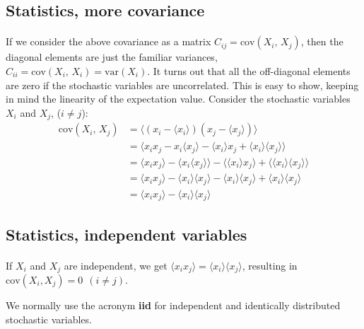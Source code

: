 \documentclass[%
oneside,                 %
final,                   %
10pt]{article}
\begin{document}
\subsection{Statistics, more covariance}

\paragraph{}
If we consider the above covariance as a matrix $C_{ij}=\mathrm{cov}(X_i,\,X_j)$, then the diagonal elements are just the familiar
variances, $C_{ii} = \mathrm{cov}(X_i,\,X_i) = \mathrm{var}(X_i)$. It turns out that
all the off-diagonal elements are zero if the stochastic variables are
uncorrelated. This is easy to show, keeping in mind the linearity of
the expectation value. Consider the stochastic variables $X_i$ and
$X_j$, ($i\neq j$):
\begin{align}
\mathrm{cov}(X_i,\,X_j) &= \langle(x_i-\langle x_i\rangle)(x_j-\langle x_j\rangle)\rangle\\
&=\langle x_i x_j - x_i\langle x_j\rangle - \langle x_i\rangle x_j + \langle x_i\rangle\langle x_j\rangle\rangle \\
&=\langle x_i x_j\rangle - \langle x_i\langle x_j\rangle\rangle - \langle \langle x_i\rangle x_j\rangle +
\langle \langle x_i\rangle\langle x_j\rangle\rangle\\
&=\langle x_i x_j\rangle - \langle x_i\rangle\langle x_j\rangle - \langle x_i\rangle\langle x_j\rangle +
\langle x_i\rangle\langle x_j\rangle\\
&=\langle x_i x_j\rangle - \langle x_i\rangle\langle x_j\rangle
\end{align}




\subsection{Statistics, independent variables}

\paragraph{}
If $X_i$ and $X_j$ are independent, we get 
$\langle x_i x_j\rangle =\langle x_i\rangle\langle x_j\rangle$, resulting in $\mathrm{cov}(X_i, X_j) = 0\ \ (i\neq j)$.

We normally use the acronym \textbf{iid} for independent and identically distributed stochastic variables.
\end{document}

